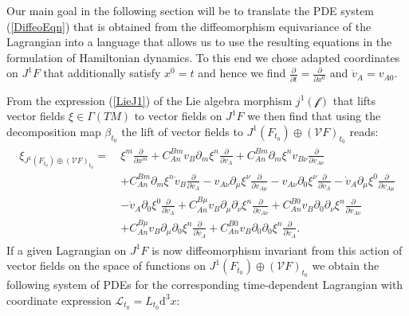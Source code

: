 Our main goal in the following section will be to translate the PDE system (\ref{DiffeoEqn}) that is obtained from the diffeomorphism equivariance of the Lagrangian into a language that allows us to use the resulting equations in the formulation of Hamiltonian dynamics. To this end we chose adapted coordinates on $J^1F$ that additionally satisfy $x^0 = t$ and hence we find $\frac{\partial}{\partial t} = \frac{\partial}{\partial x^0}$ and $\dot{v}_A = v_{A0}$. 

From the expression (\ref{LieJ1}) of the Lie algebra morphism $j^1(\mathcal{f})$ that lifts vector fields $\xi \in \Gamma(TM)$ to vector fields on $J^1F$ we then find that using the decomposition map $\beta_{t_0}$ the lift of vector fields to $J^1(F_{t_0}) \oplus (\mathcal{V}F)_{t_0}$ reads:
\begin{align}\label{LieJ1Dec}
\begin{aligned}
    \xi_{J^1(F_{t_0}) \oplus (\mathcal{V}F)_{t_0}} = \ &\xi^m \frac{\partial}{\partial x^m} + C_{An}^{Bm} v_B \partial_{m} \xi ^n \frac{\partial}{\partial v_A}
    + C_{An}^{Bm} \partial_{m} \xi^n v_{B\nu} \frac{\partial}{\partial v_{A\nu}}\\
    &+ C_{An}^{Bm} \partial_{m} \xi^n \dot{v}_{B} \frac{\partial}{\partial \dot{v}_A} - v_{A\nu} \partial_{\mu} \xi^{\nu} \frac{\partial}{\partial v_{A\mu}} 
     - v_{A\nu} \partial_{0} \xi^{\nu} \frac{\partial}{\partial \dot{v}_{A}} 
    - \dot{v}_{A} \partial_{\mu} \xi^{0} \frac{\partial}{\partial v_{A\mu}}\\
     &- \dot{v}_{A} \partial_{0} \xi^{0} \frac{\partial}{\partial \dot{v}_{A}}
    + C_{An}^{B\mu} v_B \partial_{\mu} \partial_{\nu} \xi^n \frac{\partial}{\partial v_{A\nu}}
    + C_{An}^{B0} v_B \partial_{0} \partial_{\nu} \xi^n \frac{\partial}{\partial v_{A\nu}}\\
    &+ C_{An}^{B\mu} v_B \partial_{\mu} \partial_{0} \xi^n \frac{\partial}{\partial \dot{v}_{A}}
    + C_{An}^{B0} v_B \partial_{0} \partial_{0} \xi^n \frac{\partial}{\partial \dot{v}_{A}}.
\end{aligned}
\end{align}
If a given Lagrangian on $J^1F$ is now diffeomorphism invariant from this action of vector fields on the space of functions on $J^1(F_{t_0}) \oplus (\mathcal{V}F)_{t_0}$ we obtain the following system of PDEs for the corresponding time-dependent Lagrangian with coordinate expression $\mathcal{L}_{t_0} = L_{t_0}\mathrm{d}^3x$:
